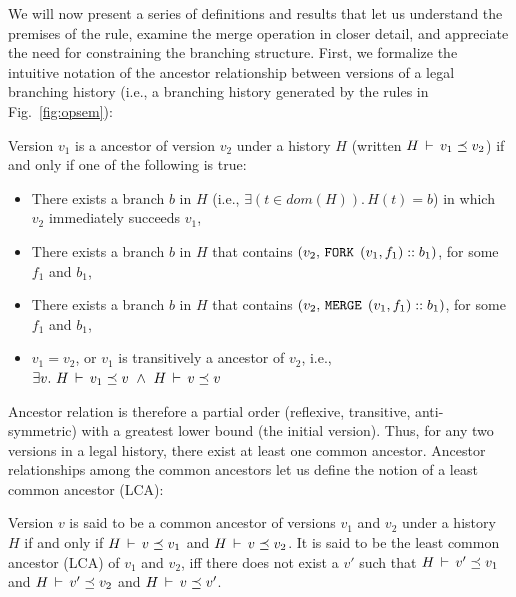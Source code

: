 We will now present a series of definitions and results that let us
understand the premises of the  rule, examine
the merge operation in closer detail, and appreciate the need for
constraining the branching structure. First, we formalize the
intuitive notation of the ancestor relationship between versions of a
legal branching history (i.e., a branching history generated by the
rules in Fig.~\ref{fig:opsem}):

\begin{definition} 
Version $v_1$ is a ancestor of version $v_2$ under a history
$H$ (written $H\,\vdash\,v_1 \preceq v_2$) if and only if one of the
following is true:
\begin{itemize}
  \item There exists a branch $b$ in $H$ (i.e., $\exists(t\in
  dom(H)).\,H(t) = b$) in which $v_2$ immediately succeeds
  $v_1$,
  \item There exists a branch $b$ in $H$ that contains $(v_2, 
  \,{\tt FORK}\,\; (v_1,f_1)::b_1)$, for some $f_1$ and $b_1$,
  \item There exists a branch $b$ in $H$ that contains
  $(v_2, \,{\tt MERGE}\,\;(v_1,f_1)::b_1)$, for some $f_1$ and $b_1$,
  \item $v_1 = v_2$, or $v_1$ is transitively a ancestor of
  $v_2$, i.e., $\exists v.~ H\,\vdash\,v_1 \preceq v ~\wedge~
  H\,\vdash\,v \preceq v$ 
\end{itemize}
\end{definition}

Ancestor relation is therefore a partial order (reflexive, transitive,
anti-symmetric) with a greatest lower bound (the initial version).
Thus, for any two versions in a legal history, there exist at least
one common ancestor. Ancestor relationships among the common ancestors
let us define the notion of a least common ancestor (LCA):

\begin{definition} 
Version $v$ is said to be a common ancestor of versions $v_1$ and
$v_2$ under a history $H$ if and only if $H\,\vdash\,v \preceq v_1$
and $H\,\vdash\,v \preceq v_2$. It is said to be the least common
ancestor (LCA) of $v_1$ and $v_2$, iff there does not exist a $v'$
such that $H\,\vdash\,v' \preceq v_1$ and $H\,\vdash\,v' \preceq v_2$
and $H\,\vdash\,v \preceq v'$.
\end{definition}

